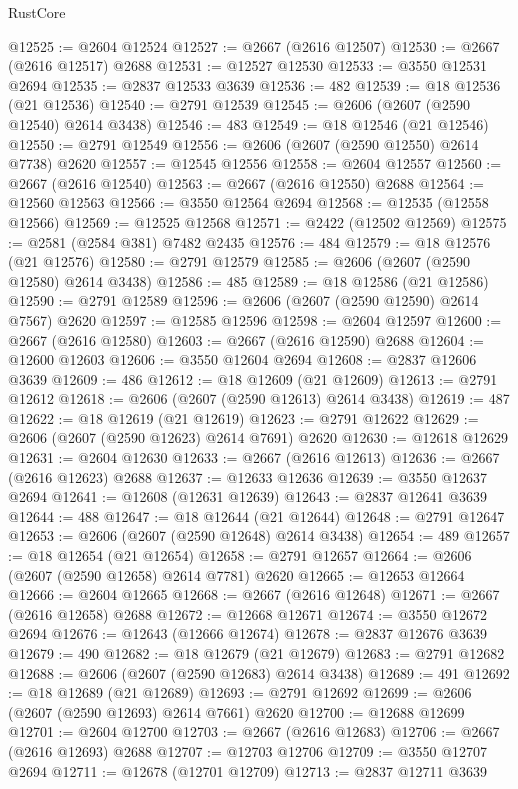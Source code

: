 \begin{lexlean}{RustCore}
\begin{coremodule}
@12525 := @2604 @12524
@12527 := @2667 (@2616 @12507)
@12530 := @2667 (@2616 @12517) @2688
@12531 := @12527 @12530
@12533 := @3550 @12531 @2694
@12535 := @2837 @12533 @3639
@12536 := 482
@12539 := @18 @12536 (@21 @12536)
@12540 := @2791 @12539
@12545 := @2606 (@2607 (@2590 @12540) @2614 @3438)
@12546 := 483
@12549 := @18 @12546 (@21 @12546)
@12550 := @2791 @12549
@12556 := @2606 (@2607 (@2590 @12550) @2614 @7738) @2620
@12557 := @12545 @12556
@12558 := @2604 @12557
@12560 := @2667 (@2616 @12540)
@12563 := @2667 (@2616 @12550) @2688
@12564 := @12560 @12563
@12566 := @3550 @12564 @2694
@12568 := @12535 (@12558 @12566)
@12569 := @12525 @12568
@12571 := @2422 (@12502 @12569)
@12575 := @2581 (@2584 @381) @7482 @2435
@12576 := 484
@12579 := @18 @12576 (@21 @12576)
@12580 := @2791 @12579
@12585 := @2606 (@2607 (@2590 @12580) @2614 @3438)
@12586 := 485
@12589 := @18 @12586 (@21 @12586)
@12590 := @2791 @12589
@12596 := @2606 (@2607 (@2590 @12590) @2614 @7567) @2620
@12597 := @12585 @12596
@12598 := @2604 @12597
@12600 := @2667 (@2616 @12580)
@12603 := @2667 (@2616 @12590) @2688
@12604 := @12600 @12603
@12606 := @3550 @12604 @2694
@12608 := @2837 @12606 @3639
@12609 := 486
@12612 := @18 @12609 (@21 @12609)
@12613 := @2791 @12612
@12618 := @2606 (@2607 (@2590 @12613) @2614 @3438)
@12619 := 487
@12622 := @18 @12619 (@21 @12619)
@12623 := @2791 @12622
@12629 := @2606 (@2607 (@2590 @12623) @2614 @7691) @2620
@12630 := @12618 @12629
@12631 := @2604 @12630
@12633 := @2667 (@2616 @12613)
@12636 := @2667 (@2616 @12623) @2688
@12637 := @12633 @12636
@12639 := @3550 @12637 @2694
@12641 := @12608 (@12631 @12639)
@12643 := @2837 @12641 @3639
@12644 := 488
@12647 := @18 @12644 (@21 @12644)
@12648 := @2791 @12647
@12653 := @2606 (@2607 (@2590 @12648) @2614 @3438)
@12654 := 489
@12657 := @18 @12654 (@21 @12654)
@12658 := @2791 @12657
@12664 := @2606 (@2607 (@2590 @12658) @2614 @7781) @2620
@12665 := @12653 @12664
@12666 := @2604 @12665
@12668 := @2667 (@2616 @12648)
@12671 := @2667 (@2616 @12658) @2688
@12672 := @12668 @12671
@12674 := @3550 @12672 @2694
@12676 := @12643 (@12666 @12674)
@12678 := @2837 @12676 @3639
@12679 := 490
@12682 := @18 @12679 (@21 @12679)
@12683 := @2791 @12682
@12688 := @2606 (@2607 (@2590 @12683) @2614 @3438)
@12689 := 491
@12692 := @18 @12689 (@21 @12689)
@12693 := @2791 @12692
@12699 := @2606 (@2607 (@2590 @12693) @2614 @7661) @2620
@12700 := @12688 @12699
@12701 := @2604 @12700
@12703 := @2667 (@2616 @12683)
@12706 := @2667 (@2616 @12693) @2688
@12707 := @12703 @12706
@12709 := @3550 @12707 @2694
@12711 := @12678 (@12701 @12709)
@12713 := @2837 @12711 @3639

\end{coremodule}
\end{lexlean}
